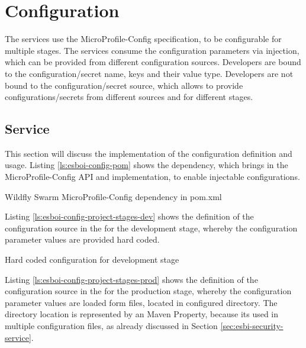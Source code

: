 \section{Configuration}
\label{sec:esbi-configuration}
The services use the MicroProfile-Config specification, to be configurable for multiple stages. The services consume the configuration parameters via injection, which can be provided from different configuration sources. Developers are bound to the configuration/secret name, keys and their value type. Developers are not bound to the configuration/secret source, which allows to provide configurations/secrets from different sources and for different stages. 

\subsection{Service}
\label{sec:esbi-config-service}
This section will discuss the implementation of the configuration definition and usage. Listing \vref{ls:esboi-config-pom} shows the dependency, which brings in the MicroProfile-Config API and implementation, to enable injectable configurations.
 
\begin{listing}[h]
	\caption{Wildfly Swarm MicroProfile-Config dependency in pom.xml}
	\label{ls:esboi-config-pom}
\end{listing}

Listing \vref{ls:esboi-config-project-stages-dev} shows the definition of the configuration source in the  for the development stage, whereby the configuration parameter values are provided hard coded.
\newpage

\begin{listing}[h]
	\caption{Hard coded configuration for development stage}
	\label{ls:esboi-config-project-stages-dev}
\end{listing}

Listing \vref{ls:esboi-config-project-stages-prod} shows the definition of the configuration source in the  for the production stage, whereby the configuration parameter values are loaded form files, located in configured directory. The directory location is represented by an Maven Property, because its used in multiple configuration files, as already discussed in Section \vref{sec:esbi-security-service}.

